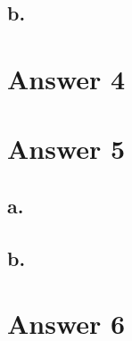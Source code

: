 \documentclass[12pt]{article}
\begin{document}
\subsection*{b.}


\section*{Answer 4}

\section*{Answer 5}

\subsection*{a.}

\subsection*{b.}



\section*{Answer 6}
\end{document}
